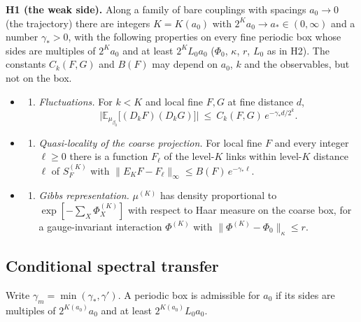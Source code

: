 \documentclass[11pt,a4paper]{article}
\newcommand{\tightlist}{\setlength{\itemsep}{0pt}\setlength{\parskip}{0pt}}
\begin{document}
\textbf{H1 (the weak side).} Along a family of bare couplings with
spacings \(a_0\to0\) (the trajectory) there are integers \(K=K(a_0)\)
with \(2^Ka_0\to a_*\in(0,\infty)\) and a number \(\gamma_*>0\), with
the following properties on every fine periodic box whose sides are
multiples of \(2^Ka_0\) and at least \(2^KL_0a_0\) (\(\Phi_0\),
\(\kappa\), \(r\), \(L_0\) as in H2). The constants \(C_k(F,G)\) and
\(B(F)\) may depend on \(a_0\), \(k\) and the observables, but not on
the box.

\begin{itemize}
\item
  \begin{enumerate}
  \def\labelenumi{(\alph{enumi})}
  \tightlist
  \item
    \emph{Fluctuations.} For \(k<K\) and local fine \(F,G\) at fine
    distance \(d\),
    \[\big|\mathbb E_{\mu_{\beta_0}}\big[(D_kF)(D_kG)\big]\big|\ \le\ C_k(F,G)\,e^{-\gamma_*d/2^k}.\]
  \end{enumerate}
\item
  \begin{enumerate}
  \def\labelenumi{(\alph{enumi})}
  \setcounter{enumi}{1}
  \tightlist
  \item
    \emph{Quasi-locality of the coarse projection.} For local fine \(F\)
    and every integer \(\ell\ge0\) there is a function \(F_\ell\) of the
    level-\(K\) links within level-\(K\) distance \(\ell\) of
    \(S_F^{(K)}\) with
    \(\|E_KF-F_\ell\|_\infty\le B(F)\,e^{-\gamma_*\ell}\).
  \end{enumerate}
\item
  \begin{enumerate}
  \def\labelenumi{(\alph{enumi})}
  \setcounter{enumi}{2}
  \tightlist
  \item
    \emph{Gibbs representation.} \(\mu^{(K)}\) has density proportional
    to \(\exp[-\sum_X\Phi^{(K)}_X]\) with respect to Haar measure on the
    coarse box, for a gauge-invariant interaction \(\Phi^{(K)}\) with
    \(\|\Phi^{(K)}-\Phi_0\|_\kappa\le r\).
  \end{enumerate}
\end{itemize}

\hypertarget{conditional-spectral-transfer}{%
\subsection{Conditional spectral
transfer}\label{conditional-spectral-transfer}}

Write \(\gamma_m=\min(\gamma_*,\gamma')\). A periodic box is admissible
for \(a_0\) if its sides are multiples of \(2^{K(a_0)}a_0\) and at least
\(2^{K(a_0)}L_0a_0\).
\end{document}
